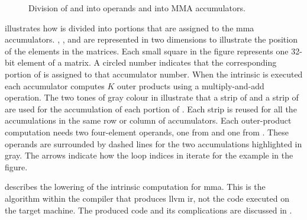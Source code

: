\documentclass[\main/thesis.tex]{subfiles}
\begin{document}
\begin{figure}[t]
  \caption[Operand and Accumulator Layout in MMA]{Division of  and  into operands and  into MMA accumulators.}
  \label{fig:intrinsic}
\end{figure}

 illustrates how  is divided into portions that are assigned to the \gls{mma} accumulators.
, , and  are represented in two dimensions to illustrate the position of the elements in the matrices.
Each small square in the figure represents one 32-bit element of a matrix.
A circled number indicates that the corresponding portion of  is assigned to that accumulator number.
When the intrinsic is executed each accumulator computes $K$ outer products using a multiply-and-add operation.
The two tones of gray colour in  illustrate that a strip of  and a strip of  are used for the accumulation of each portion of .
Each strip is reused for all the accumulations in the same row or column of accumulators.
Each outer-product computation needs two four-element operands, one from  and one from .
These operands are surrounded by dashed lines for the two accumulations highlighted in gray.
The arrows indicate how the loop indices in  iterate for the example in the figure.

 describes the lowering of the intrinsic computation for \gls{mma}.
This is the algorithm within the compiler that produces \gls{llvm} \gls{ir}, not the code executed on the target machine.
The produced code and its complications are discussed in .
\end{document}
